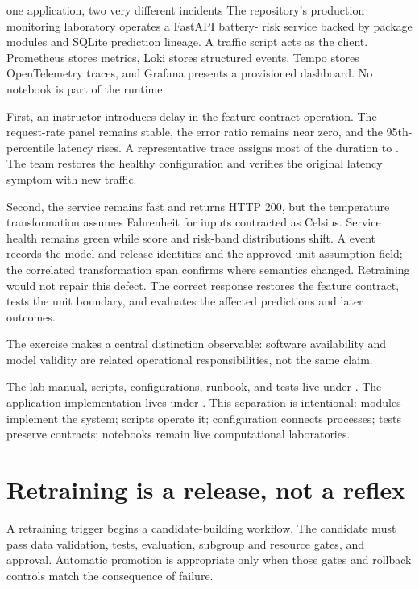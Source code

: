 \begin{workedexample}{one application, two very different incidents}
The repository's production monitoring laboratory operates a FastAPI battery-
risk service backed by package modules and SQLite prediction lineage. A traffic
script acts as the client. Prometheus stores metrics, Loki stores structured
events, Tempo stores OpenTelemetry traces, and Grafana presents a provisioned
dashboard. No notebook is part of the runtime.

First, an instructor introduces delay in the feature-contract operation. The
request-rate panel remains stable, the error ratio remains near zero, and the
95th-percentile latency rises. A representative trace assigns most of the
duration to . The team restores the healthy
configuration and verifies the original latency symptom with new traffic.

Second, the service remains fast and returns HTTP 200, but the temperature
transformation assumes Fahrenheit for inputs contracted as Celsius. Service
health remains green while score and risk-band distributions shift. A
 event records the model and release identities and
the approved unit-assumption field; the correlated transformation span confirms
where semantics changed. Retraining would not repair this defect. The correct
response restores the feature contract, tests the unit boundary, and evaluates
the affected predictions and later outcomes.

The exercise makes a central distinction observable: software availability and
model validity are related operational responsibilities, not the same claim.
\end{workedexample}

The lab manual, scripts, configurations, runbook, and tests live under
. The application implementation lives
under . This separation is intentional:
modules implement the system; scripts operate it; configuration connects
processes; tests preserve contracts; notebooks remain live computational
laboratories.

\section{Retraining is a release, not a reflex}

A retraining trigger begins a candidate-building workflow. The candidate must
pass data validation, tests, evaluation, subgroup and resource gates, and
approval. Automatic promotion is appropriate only when those gates and rollback
controls match the consequence of failure.

